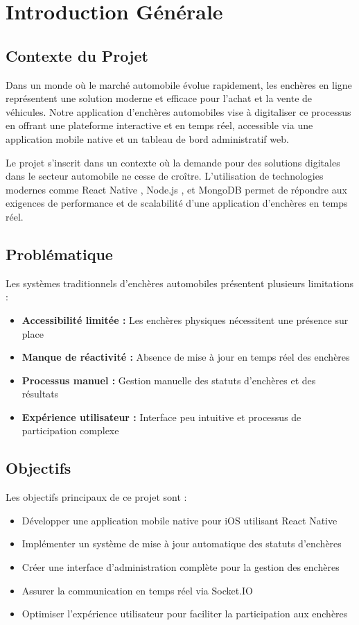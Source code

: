 \chapter{Introduction Générale}

\section{Contexte du Projet}
Dans un monde où le marché automobile évolue rapidement, les enchères en ligne représentent une solution moderne et efficace pour l'achat et la vente de véhicules. Notre application d'enchères automobiles vise à digitaliser ce processus en offrant une plateforme interactive et en temps réel, accessible via une application mobile native et un tableau de bord administratif web.

Le projet s'inscrit dans un contexte où la demande pour des solutions digitales dans le secteur automobile ne cesse de croître. L'utilisation de technologies modernes comme React Native \cite{reactnative}, Node.js \cite{nodejs}, et MongoDB \cite{mongodb} permet de répondre aux exigences de performance et de scalabilité d'une application d'enchères en temps réel.

\section{Problématique}
Les systèmes traditionnels d'enchères automobiles présentent plusieurs limitations :
\begin{itemize}
    \item \textbf{Accessibilité limitée :} Les enchères physiques nécessitent une présence sur place
    \item \textbf{Manque de réactivité :} Absence de mise à jour en temps réel des enchères
    \item \textbf{Processus manuel :} Gestion manuelle des statuts d'enchères et des résultats
    \item \textbf{Expérience utilisateur :} Interface peu intuitive et processus de participation complexe
\end{itemize}

\section{Objectifs}
Les objectifs principaux de ce projet sont :
\begin{itemize}
    \item Développer une application mobile native pour iOS utilisant React Native
    \item Implémenter un système de mise à jour automatique des statuts d'enchères
    \item Créer une interface d'administration complète pour la gestion des enchères
    \item Assurer la communication en temps réel via Socket.IO \cite{socketio}
    \item Optimiser l'expérience utilisateur pour faciliter la participation aux enchères
\end{itemize}

